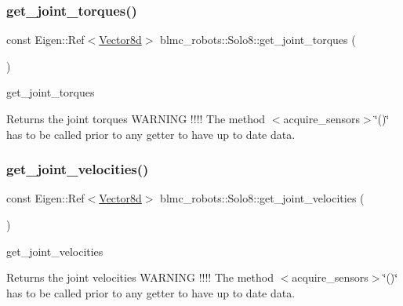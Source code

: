 \subsubsection{\texorpdfstring{get\+\_\+joint\+\_\+torques()}{get\_joint\_torques()}}
{\footnotesize\ttfamily const Eigen\+::\+Ref$<$\hyperlink{common__header_8hpp_a98975ffbe0bca1296078e0350dfedd60}{Vector8d}$>$ blmc\+\_\+robots\+::\+Solo8\+::get\+\_\+joint\+\_\+torques (\begin{DoxyParamCaption}{ }\end{DoxyParamCaption})\hspace{0.3cm}{\ttfamily [inline]}}



get\+\_\+joint\+\_\+torques 

\begin{DoxyReturn}{Returns}
the joint torques W\+A\+R\+N\+I\+NG !!!! The method $<$acquire\+\_\+sensors$>$\char`\"{}()\char`\"{} has to be called prior to any getter to have up to date data. 
\end{DoxyReturn}
\mbox{\label{classblmc__robots_1_1Solo8_a2e27aa306a9f2a1812274156314eed9b}} 
\subsubsection{\texorpdfstring{get\+\_\+joint\+\_\+velocities()}{get\_joint\_velocities()}}
{\footnotesize\ttfamily const Eigen\+::\+Ref$<$\hyperlink{common__header_8hpp_a98975ffbe0bca1296078e0350dfedd60}{Vector8d}$>$ blmc\+\_\+robots\+::\+Solo8\+::get\+\_\+joint\+\_\+velocities (\begin{DoxyParamCaption}{ }\end{DoxyParamCaption})\hspace{0.3cm}{\ttfamily [inline]}}



get\+\_\+joint\+\_\+velocities 

\begin{DoxyReturn}{Returns}
the joint velocities W\+A\+R\+N\+I\+NG !!!! The method $<$acquire\+\_\+sensors$>$\char`\"{}()\char`\"{} has to be called prior to any getter to have up to date data. 
\end{DoxyReturn}
\mbox{\label{classblmc__robots_1_1Solo8_a5ed9b4edda3e20305abce34bcb1b46f2}} 
